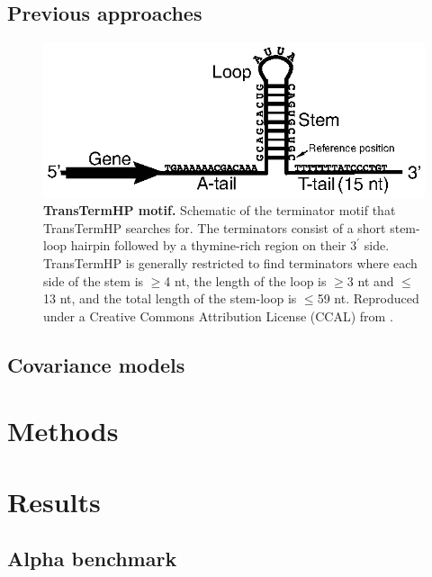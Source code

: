 \subsection{Previous approaches}
\begin{figure}[htp]
\begin{center}
\includegraphics[width=14cm]{transterm}
\caption[TransTermHP motif]{\textbf{TransTermHP motif.} Schematic of the terminator motif that TransTermHP searches for. The terminators consist of a short stem-loop hairpin followed by a thymine-rich region on their $3^\prime$ side. TransTermHP is generally restricted to find terminators where each side of the stem is $\ge$4 nt, the length of the loop is $\ge$3 nt and $\le$13 nt, and the total length of the stem-loop is $\le$59 nt. Reproduced under a Creative Commons Attribution License (CCAL) from \textcite{Kingsford2007}.
} 
\label{fig:transterm}
\end{center}
\end{figure}
\subsection{Covariance models}

\section{Methods}

\section{Results}
\subsection{Alpha benchmark}

